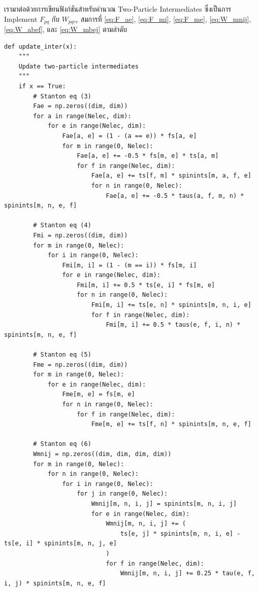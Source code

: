 \noindent เรามาต่อด้วยการเขียนฟังก์ชันสำหรับคำนวณ Two-Particle Intermediates ซึ่งเป็นการ Implement $F_{p q}$ กับ $W_{p q r s}$ สมการที่ \eqref{eq:F_ae}, \eqref{eq:F_mi}, \eqref{eq:F_me}, \eqref{eq:W_mnij}, \eqref{eq:W_abef}, และ \eqref{eq:W_mbej} ตามลำดับ

\vspace{5pt}

\begin{lstlisting}[style=MyPython]
def update_inter(x):
    """
    Update two-particle intermediates
    """
    if x == True:
        # Stanton eq (3)
        Fae = np.zeros((dim, dim))
        for a in range(Nelec, dim):
            for e in range(Nelec, dim):
                Fae[a, e] = (1 - (a == e)) * fs[a, e]
                for m in range(0, Nelec):
                    Fae[a, e] += -0.5 * fs[m, e] * ts[a, m]
                    for f in range(Nelec, dim):
                        Fae[a, e] += ts[f, m] * spinints[m, a, f, e]
                        for n in range(0, Nelec):
                            Fae[a, e] += -0.5 * taus(a, f, m, n) * spinints[m, n, e, f]

        # Stanton eq (4)
        Fmi = np.zeros((dim, dim))
        for m in range(0, Nelec):
            for i in range(0, Nelec):
                Fmi[m, i] = (1 - (m == i)) * fs[m, i]
                for e in range(Nelec, dim):
                    Fmi[m, i] += 0.5 * ts[e, i] * fs[m, e]
                    for n in range(0, Nelec):
                        Fmi[m, i] += ts[e, n] * spinints[m, n, i, e]
                        for f in range(Nelec, dim):
                            Fmi[m, i] += 0.5 * taus(e, f, i, n) * spinints[m, n, e, f]

        # Stanton eq (5)
        Fme = np.zeros((dim, dim))
        for m in range(0, Nelec):
            for e in range(Nelec, dim):
                Fme[m, e] = fs[m, e]
                for n in range(0, Nelec):
                    for f in range(Nelec, dim):
                        Fme[m, e] += ts[f, n] * spinints[m, n, e, f]

        # Stanton eq (6)
        Wmnij = np.zeros((dim, dim, dim, dim))
        for m in range(0, Nelec):
            for n in range(0, Nelec):
                for i in range(0, Nelec):
                    for j in range(0, Nelec):
                        Wmnij[m, n, i, j] = spinints[m, n, i, j]
                        for e in range(Nelec, dim):
                            Wmnij[m, n, i, j] += (
                                ts[e, j] * spinints[m, n, i, e] - ts[e, i] * spinints[m, n, j, e]
                            )
                            for f in range(Nelec, dim):
                                Wmnij[m, n, i, j] += 0.25 * tau(e, f, i, j) * spinints[m, n, e, f]


\end{lstlisting}
